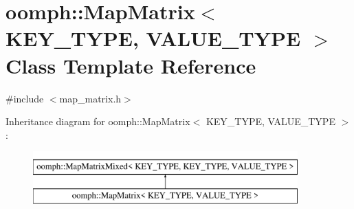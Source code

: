 \hypertarget{classoomph_1_1MapMatrix}{}\section{oomph\+:\+:Map\+Matrix$<$ K\+E\+Y\+\_\+\+T\+Y\+PE, V\+A\+L\+U\+E\+\_\+\+T\+Y\+PE $>$ Class Template Reference}
\label{classoomph_1_1MapMatrix}


{\ttfamily \#include $<$map\+\_\+matrix.\+h$>$}

Inheritance diagram for oomph\+:\+:Map\+Matrix$<$ K\+E\+Y\+\_\+\+T\+Y\+PE, V\+A\+L\+U\+E\+\_\+\+T\+Y\+PE $>$\+:\begin{figure}[H]
\begin{center}
\leavevmode
\includegraphics[height=2.000000cm]{classoomph_1_1MapMatrix}
\end{center}
\end{figure}
